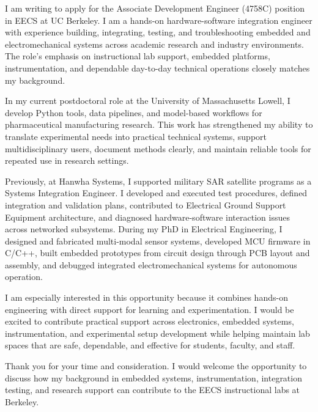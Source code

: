 \documentclass[letterpaper,11pt]{moderncv}
\date{\today}
\begin{document}
\makelettertitle

I am writing to apply for the Associate Development Engineer (4758C) position in EECS at UC Berkeley. I am a hands-on hardware-software integration engineer with experience building, integrating, testing, and troubleshooting embedded and electromechanical systems across academic research and industry environments. The role's emphasis on instructional lab support, embedded platforms, instrumentation, and dependable day-to-day technical operations closely matches my background.

In my current postdoctoral role at the University of Massachusetts Lowell, I develop Python tools, data pipelines, and model-based workflows for pharmaceutical manufacturing research. This work has strengthened my ability to translate experimental needs into practical technical systems, support multidisciplinary users, document methods clearly, and maintain reliable tools for repeated use in research settings.

Previously, at Hanwha Systems, I supported military SAR satellite programs as a Systems Integration Engineer. I developed and executed test procedures, defined integration and validation plans, contributed to Electrical Ground Support Equipment architecture, and diagnosed hardware-software interaction issues across networked subsystems. During my PhD in Electrical Engineering, I designed and fabricated multi-modal sensor systems, developed MCU firmware in C/C++, built embedded prototypes from circuit design through PCB layout and assembly, and debugged integrated electromechanical systems for autonomous operation.

I am especially interested in this opportunity because it combines hands-on engineering with direct support for learning and experimentation. I would be excited to contribute practical support across electronics, embedded systems, instrumentation, and experimental setup development while helping maintain lab spaces that are safe, dependable, and effective for students, faculty, and staff.

Thank you for your time and consideration. I would welcome the opportunity to discuss how my background in embedded systems, instrumentation, integration testing, and research support can contribute to the EECS instructional labs at Berkeley.

\makeletterclosing
\end{document}
